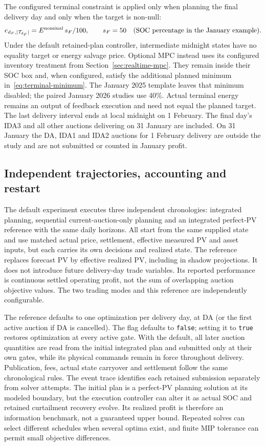 \documentclass[11pt,a4paper]{article}
\begin{document}
The configured terminal constraint is applied only when planning the final
delivery day and only when the target is non-null:
\begin{equation}
 e_{d_F,|\mathcal T_{d_F}|}
   =E^{\rm nominal}\,s_F/100,\qquad s_F=50
       \quad\hbox{(SOC percentage in the January example)}.
\end{equation}
Under the default retained-plan controller, intermediate midnight states have
no equality target or energy salvage price. Optional MPC instead uses its
configured inventory treatment from Section~\ref{sec:realtime-mpc}.
They remain inside their SOC box and, when configured, satisfy the additional
planned minimum in~\eqref{eq:terminal-minimum}. The January 2025 template
leaves that minimum disabled; the paired January 2026 studies use 40\%. Actual terminal energy remains
an output of feedback execution and need not equal the planned target. The
last delivery interval ends at local midnight on 1 February. The final day's
IDA3 and all other auctions delivering on 31 January are included. On 31 January
the DA, IDA1 and IDA2 auctions for 1 February delivery are outside the study and
are not submitted or counted in January profit.

\subsection{Independent trajectories, accounting and restart}
The default experiment executes three independent chronologies: integrated
planning, sequential current-auction-only planning and an integrated
perfect-PV reference with the same daily horizons. All start from the same
supplied state and use matched actual price, settlement, effective measured
PV and asset inputs, but each carries its own decisions and realized state.
The reference replaces forecast PV by effective realized PV, including in
shadow projections. It does not introduce future delivery-day trade variables.
Its reported performance is continuous settled operating profit, not the sum
of overlapping auction objective values. The two trading modes and this
reference are independently configurable.

The reference defaults to one optimization per delivery day, at DA (or the
first active auction if DA is cancelled). The flag
 defaults
to \texttt{false}; setting it to \texttt{true} restores optimization at every
active gate. With the default, all later auction quantities are read from
the initial integrated plan and submitted only at their own gates, while its
physical commands remain in force throughout delivery. Publication, fees,
actual state carryover and settlement follow the same chronological rules.
The event trace identifies each retained submission separately from solver
attempts. The initial plan is a perfect-PV planning solution at its modeled
boundary, but the execution controller can alter it as actual SOC and retained
curtailment recovery evolve. Its realized profit is therefore an information
benchmark, not a guaranteed upper bound. Repeated solves can select different
schedules when several optima exist, and finite MIP tolerance can permit small
objective differences.
\end{document}
